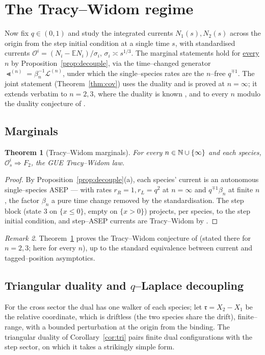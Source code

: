 \documentclass[11pt]{article}
\theoremstyle{plain}
\newtheorem{theorem}{Theorem}[section]
\theoremstyle{definition}
\theoremstyle{remark}
\newtheorem{remark}[theorem]{Remark}
\newcommand{\E}{\mathbb{E}}\newcommand{\PP}{\mathbb{P}}\newcommand{\dd}{\,\mathrm{d}}
\newcommand{\To}{\Rightarrow}\newcommand{\so}{\mathfrak{so}}
\newcommand{\cL}{\mathcal L}\newcommand{\cO}{\mathcal O}\newcommand{\cE}{\mathcal E}
\begin{document}
\section{The Tracy--Widom regime}\label{sec:tw}

Now fix $q\in(0,1)$ and study the integrated currents $N_1(s),N_2(s)$ across the origin
from the step initial condition at a single time $s$, with standardised currents
$\cO^i=(N_i-\E N_i)/\sigma_i$, $\sigma_i\asymp s^{1/3}$. The marginal statements hold
for \underline{every} $n$ by Proposition~\ref{prop:decouple}, via the time--changed
generator $\Lt^{(n)}=\beta_n^{-1}\cL^{(n)}$, under which the single--species rates
are the $n$--free $q^{\mp1}$. The joint statement (Theorem~\ref{thm:cov}) uses the
duality and is proved at $n=\infty$; it extends verbatim to $n=2,3$, where the
duality is known \cite{REU}, and to every $n$ modulo the duality conjecture of
\cite[Rmk.~4]{REU}.

\subsection{Marginals}
\begin{theorem}[Tracy--Widom marginals]\label{thm:marg}
For every $n\in\mathbb{N}\cup\{\infty\}$ and each species, $\cO^i_s\To F_2$, the GUE
Tracy--Widom law.
\end{theorem}
\begin{proof}
By Proposition~\ref{prop:decouple}(a), each species' current
is an autonomous single--species ASEP --- with rates $r_R=1,r_L=q^2$ at $n=\infty$ and
$q^{\mp1}\beta_n$ at finite $n$, the factor $\beta_n$ a pure time change removed by
the standardisation. The step block (state $3$ on $\{x\le0\}$, empty on $\{x>0\}$)
projects, per species, to the step initial condition, and step--ASEP currents are
Tracy--Widom by \cite[Thm.~1.4]{BCS}.
\end{proof}

\begin{remark}
Theorem~\ref{thm:marg} proves the Tracy--Widom conjecture of \cite[\S3.1.1]{REU}
(stated there for $n=2,3$; here for every $n$), up to the standard equivalence
between current and tagged--position asymptotics.
\end{remark}

\subsection{Triangular duality and $q$--Laplace decoupling}
For the cross sector the dual has one walker of each species; let
$\mathfrak r=X_2-X_1$ be the relative coordinate, which is driftless (the two species
share the drift), finite--range, with a bounded perturbation at the origin from the
binding. The triangular duality of Corollary~\ref{cor:tri} pairs finite dual
configurations with the step sector, on which it takes a strikingly simple form.
\end{document}
